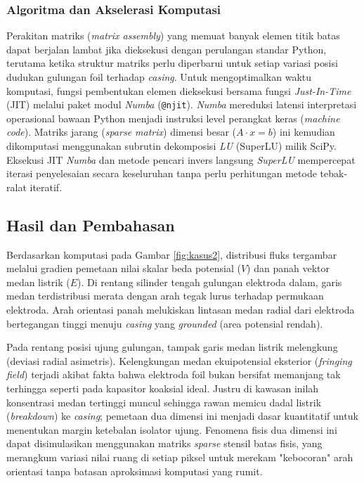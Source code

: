 \documentclass[11pt,a4paper]{article}
\begin{document}
\subsubsection{Algoritma dan Akselerasi Komputasi}
Perakitan matriks (\textit{matrix assembly}) yang memuat banyak elemen titik batas dapat berjalan lambat jika dieksekusi dengan perulangan standar Python, terutama ketika struktur matriks perlu diperbarui untuk setiap variasi posisi dudukan gulungan foil terhadap \textit{casing}. Untuk mengoptimalkan waktu komputasi, fungsi pembentukan elemen dieksekusi bersama fungsi \textit{Just-In-Time} (JIT) melalui paket modul \textit{Numba} (\texttt{@njit}). \textit{Numba} mereduksi latensi interpretasi operasional bawaan Python menjadi instruksi level perangkat keras (\textit{machine code}). Matriks jarang (\textit{sparse matrix}) dimensi besar ($A \cdot x = b$) ini kemudian dikomputasi menggunakan subrutin dekomposisi \textit{LU} (SuperLU) milik SciPy. Eksekusi JIT \textit{Numba} dan metode pencari invers langsung \textit{SuperLU} mempercepat iterasi penyelesaian secara keseluruhan tanpa perlu perhitungan metode tebak-ralat iteratif.

\subsection{Hasil dan Pembahasan}

Berdasarkan komputasi pada Gambar \ref{fig:kasus2}, distribusi fluks tergambar melalui gradien pemetaan nilai skalar beda potensial ($V$) dan panah vektor medan listrik ($E$). Di rentang silinder tengah gulungan elektroda dalam, garis medan terdistribusi merata dengan arah tegak lurus terhadap permukaan elektroda. Arah orientasi panah melukiskan lintasan medan radial dari elektroda bertegangan tinggi menuju \textit{casing} yang \textit{grounded} (area potensial rendah).

Pada rentang posisi ujung gulungan, tampak garis medan listrik melengkung (deviasi radial asimetris). Kelengkungan medan ekuipotensial eksterior (\textit{fringing field}) terjadi akibat fakta bahwa elektroda foil bukan bersifat memanjang tak terhingga seperti pada kapasitor koaksial ideal. Justru di kawasan inilah konsentrasi medan tertinggi muncul sehingga rawan memicu dadal listrik (\textit{breakdown}) ke \textit{casing}; pemetaan dua dimensi ini menjadi dasar kuantitatif untuk menentukan margin ketebalan isolator ujung. Fenomena fisis dua dimensi ini dapat disimulasikan menggunakan matriks \textit{sparse} stensil batas fisis, yang merangkum variasi nilai ruang di setiap piksel untuk merekam "kebocoran" arah orientasi tanpa batasan aproksimasi komputasi yang rumit.
\end{document}
